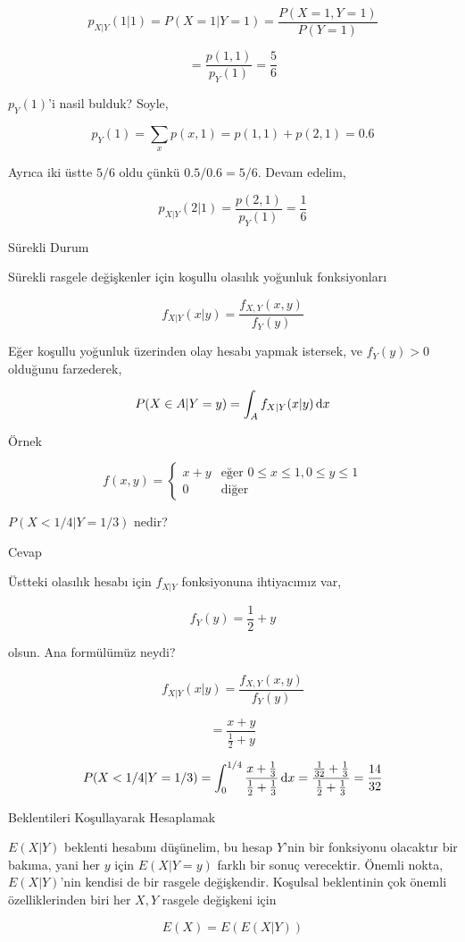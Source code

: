 \documentclass[12pt,fleqn]{article}\usepackage{../../common}
\begin{document}
$$ p_{X|Y}(1|1) = P(X=1|Y=1) = \frac{P(X=1,Y=1)}{P(Y=1)}
$$

$$ = \frac{p(1,1)}{p_Y(1)} = \frac{5}{6} $$

$p_Y(1)$'i nasil bulduk? Soyle,

$$ p_Y(1) = \sum_x p(x,1) = p(1,1) + p(2,1) = 0.6 $$

Ayrıca iki üstte $5/6$ oldu çünkü $0.5/0.6=5/6$. Devam edelim,

$$ p_{X|Y}(2|1) =
\frac{p(2,1)}{p_Y(1)} = \frac{1}{6}
$$

Sürekli Durum

Sürekli rasgele değişkenler için koşullu olasılık yoğunluk fonksiyonları 

$$ f_{X|Y}(x|y) = \frac{ f_{X,Y}(x,y)}{f_Y(y)} $$

Eğer koşullu yoğunluk üzerinden olay hesabı yapmak istersek, ve $f_Y(y) > 0$
olduğunu farzederek,

$$ P(X \in A | Y = y) = \int_A f_{X|Y}(x|y) \,\mathrm{d} x $$

Örnek 

$$ f(x,y) = 
\left\{ \begin{array}{ll}
x+y & \textrm{eğer } 0 \le x \le 1, 0 \le y \le 1 \\
0 & \textrm{diğer}
\end{array} \right.
$$

$P(X < 1/4 | Y = 1/3)$ nedir? 

Cevap 

Üstteki olasılık hesabı için $f_{X|Y}$ fonksiyonuna ihtiyacımız var,

$$ f_Y(y) = \frac{ 1}{2} + y  $$

olsun. Ana formülümüz neydi? 

$$ f_{X|Y}(x|y) = \frac{f_{X,Y}(x,y)}{f_Y(y)} $$

$$ = \frac{ x+y }{\frac{1}{2} + y} $$

$$
P(X < 1/4 | Y = 1/3) = 
\int_{ 0}^{1/4} \frac{ x+ \frac{1}{3} }{\frac{1}{2} + \frac{1 }{3}} \,\mathrm{d} x = 
\frac{\frac{1}{32}+ \frac{1}{3} }{\frac{1}{2} + \frac{1}{3}} = 
\frac{14}{32}
$$

Beklentileri Koşullayarak Hesaplamak

$E(X|Y)$ beklenti hesabını düşünelim, bu hesap $Y$'nin bir fonksiyonu olacaktır
bir bakıma, yani her $y$ için $E(X|Y=y)$ farklı bir sonuç verecektir. Önemli
nokta, $E(X|Y)$'nin kendisi de bir rasgele değişkendir. Koşulsal beklentinin çok
önemli özelliklerinden biri her $X,Y$ rasgele değişkeni için

$$ E(X) = E(E(X|Y)) $$
\end{document}

